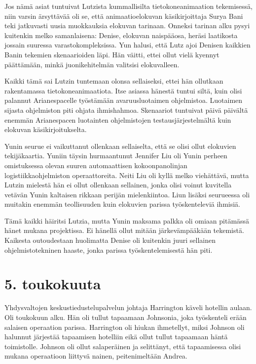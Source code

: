 Jos nämä asiat tuntuivat Lutzista kummallisilta tietokoneanimaation tekemisessä, niin varsin ärsyttävää oli se, että animaatioelokuvan käsikirjoittaja Surya Bani teki jatkuvasti uusia muokkauksia elokuvan tarinaan. Onneksi tarinan alku pysyi kuitenkin melko samanlaisena: Denise, elokuvan naispääosa, heräsi laatikosta jossain suuressa varastokompleksissa. Yun halusi, että Lutz ajoi Denisen kaikkien Banin tekemien skenaarioiden läpi. Hän väitti, ettei ollut vielä kyennyt päättämään, minkä juonikehitelmän valitsisi elokuvalleen.


Kaikki tämä sai Lutzin tuntemaan olonsa sellaiseksi, ettei hän ollutkaan rakentamassa tietokoneanimaatiota. Itse asiassa hänestä tuntui siltä, kuin olisi palannut Arianespacelle työstämään avaruusluotaimen ohjelmistoa. Luotaimen sijasta ohjelmiston piti ohjata ihmishahmoa. Skenaariot tuntuivat päivä päivältä enemmän Arianespacen luotainten ohjelmistojen testausjärjestelmältä kuin elokuvan käsikirjoitukselta.


Yunin seurue ei vaikuttanut ollenkaan sellaiselta, että se olisi ollut elokuvien tekijäkaartia. Yuniin täysin hurmaantunut Jennifer Liu oli Yunin perheen omistuksessa olevan suuren automaattisen kokoonpanolinjan logistiikkaohjelmiston operaattoreita. Neiti Liu oli kyllä melko viehättävä, mutta Lutzin mielestä hän ei ollut ollenkaan sellainen, jonka olisi voinut kuvitella vetävän Yunin kaltaisen rikkaan perijän mielenkiintoa. Liun lisäksi seurueessa oli muitakin enemmän teollisuuden kuin elokuvien parissa työskenteleviä ihmisiä.


Tämä kaikki häiritsi Lutzia, mutta Yunin maksama palkka oli omiaan pitämässä hänet mukana projektissa. Ei hänellä ollut mitään järkevämpääkään tekemistä. Kaikesta outoudestaan huolimatta Denise oli kuitenkin juuri sellainen ohjelmistotekninen haaste, jonka parissa työskentelemisestä hän piti.






\chapter{5. toukokuuta}Yhdysvaltojen keskustiedustelupalvelun johtaja Harrington käveli hotellin aulaan. Oli toukokuun alku. Hän oli tullut tapaamaan Johnsonia, joka työskenteli erään salaisen operaation parissa. Harrington oli hiukan ihmetellyt, miksi Johnson oli halunnut järjestää tapaamisen hotelliin eikä ollut tullut tapaamaan häntä toimistolle. Johnson oli ollut salaperäinen ja selittänyt, että tapaamisessa olisi mukana operaatioon liittyvä nainen, peitenimeltään Andrea.


